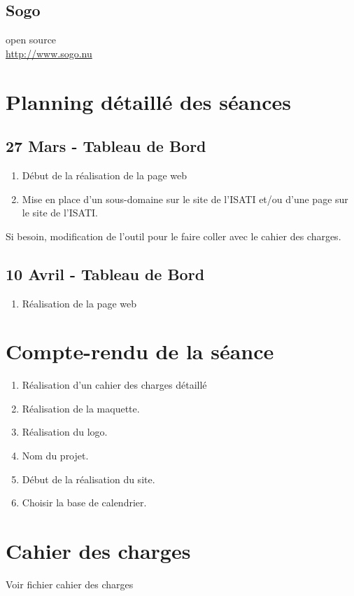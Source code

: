 \documentclass[a4paper,10pt]{article}
\begin{document}
\subsection*{Sogo}
open source\\
\url{http://www.sogo.nu}
\section{Planning détaillé des séances}
\subsection*{27 Mars - Tableau de Bord }
  \begin{enumerate}
    \item Début de la réalisation de la page web
    \item Mise en place d'un sous-domaine sur le site de l'ISATI et/ou d'une page sur le site de l'ISATI.
  \end{enumerate}
  Si besoin, modification de l'outil pour le faire coller avec le cahier des charges.
\subsection*{10 Avril - Tableau de Bord }
  \begin{enumerate}
    \item Réalisation de la page web
  \end{enumerate}

\section{Compte-rendu de la s\'eance}
  \begin{enumerate}
    \item Réalisation d'un cahier des charges détaillé
    \item Réalisation de la maquette.
    \item Réalisation du logo.
    \item Nom du projet.
    \item Début de la réalisation du site.
    \item Choisir la base de calendrier.
  \end{enumerate}

\section{Cahier des charges}
Voir fichier cahier des charges
\end{document}
